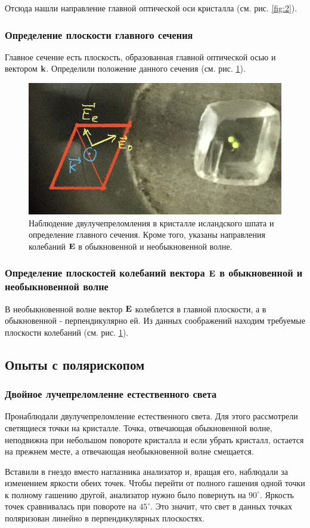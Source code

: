 \documentclass[12pt]{article}
\begin{document}
	Отсюда нашли направление главной оптической оси кристалла (см. рис. \ref{fig:2}).

	\subsubsection{Определение плоскости главного сечения}
	Главное сечение есть плоскость, образованная главной оптической осью и вектором $\vb{k}$. Определили положение данного сечения (см. рис. \ref{fig:3}).
	\begin{figure}[tb]
		\centering
		\includegraphics[width=1\linewidth]{../data/main_opt_pl}
		\caption{Наблюдение двулучепреломления в кристалле исландского шпата и определение главного сечения. Кроме того, указаны направления колебаний $\vb{E}$ в обыкновенной и необыкновенной волне.}
		\label{fig:3}
	\end{figure}

	\subsubsection{Определение плоскостей колебаний вектора $\vb{E}$ в обыкновенной и необыкновенной волне}
	В необыкновенной волне вектор $\vb{E}$ колеблется в главной плоскости, а в обыкновенной - перпендикулярно ей. Из данных соображений находим требуемые плоскости колебаний (см. рис. \ref{fig:3}).

	\subsection{Опыты с полярископом}
	\subsubsection{Двойное лучепреломление естественного света}
	Пронаблюдали двулучепреломление естественного света. Для этого рассмотрели светящиеся точки на кристалле. Точка, отвечающая обыкновенной волне, неподвижна при небольшом повороте кристалла и если убрать кристалл, остается на прежнем месте, а отвечающая необыкновенной волне смещается.
	\par Вставили в гнездо вместо наглазника анализатор и, вращая его, наблюдали за изменением яркости обеих точек. Чтобы перейти от полного гашения одной точки к полному гашению другой, анализатор нужно было повернуть на $90^\circ$. Яркость точек сравнивалась при повороте на $45^\circ$. Это значит, что свет в данных точках поляризован линейно в перпендикулярных плоскостях.
\end{document}
